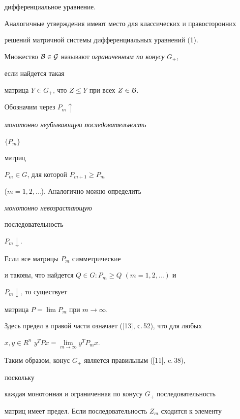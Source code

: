 дифференциальное уравнение. 


 


Аналогичные утверждения имеют место для классических и правосторонних 


решений матричной системы дифференциальных уравнений (1). 





Множество $\cal B\in G$ называют {\it ограниченным по конусу} $G_+$, 


если найдется такая 


матрица $Y\in G_+$, что $Z\le Y$ при всех $Z\in\cal B$. 


 


Обозначим через $P_m\uparrow$ {\it монотонно неубывающую последовательность 


$\{P_m\}$ 


матриц} $P_m\in G$, для которой $P_{m+1}\ge P_m$ 


($m=1,2,\dotsc$). Аналогично можно определить {\it монотонно невозрастающую 


последовательность} $P_m\downarrow$. 


 


\begin{lem} 


Если все матрицы $P_m$ симметрические 


и таковы, что найдется $Q\in G:P_m\ge Q$ $(m=1,2,\dotsc)$ и 


$P_m\downarrow$, то существует 


матрица $P=\lim P_m$ при $m\to\infty$. 


\end{lem} 


 


Здесь предел в правой части означает ([13], с.\,52), что для любых 


$x,y\in R^n$\; $y^T P x=\lim\limits_{m\to\infty}y^T P_m x$. 


 


Таким образом, конус $G_+$ является правильным ([11], c.\,38), 


поскольку 


каждая монотонная и ограниченная по конусу $G_+$ последовательность 


матриц имеет предел. Если последовательность $Z_m$ сходится к элементу 


